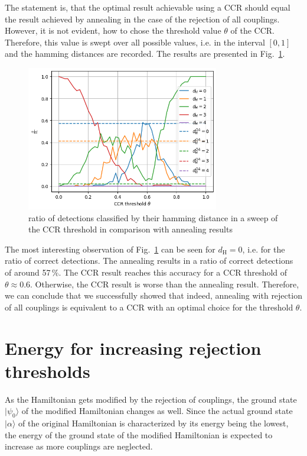 \documentclass{article}
\begin{document}
	The statement is, that the optimal result achievable using a CCR should equal the result achieved by annealing in the case of the rejection of all couplings. However, it is not evident, how to chose the threshold value $\theta$ of the CCR. Therefore, this value is swept over all possible values, i.e. in the interval $[0,1]$ and the hamming distances are recorded. The results are presented in Fig.~\ref{fig:CCR sweep}.
	\begin{figure}[h]
		\centering
		\includegraphics[width=0.75\textwidth]{img/CCR_sweep.png}
		\caption{ratio of detections classified by their hamming distance in a sweep of the CCR threshold in comparison with annealing results}
		\label{fig:CCR sweep}
	\end{figure}
	The most interesting observation of Fig.~\ref{fig:CCR sweep} can be seen for $d_\text{H}=0$, i.e. for the ratio of correct detections. The annealing results in a ratio of correct detections of around 57\,\%. The CCR result reaches this accuracy for a CCR threshold of $\theta\approx 0.6$. Otherwise, the CCR result is worse than the annealing result. Therefore, we can conclude that we successfully showed that indeed, annealing with rejection of all couplings is equivalent to a CCR with an optimal choice for the threshold $\theta$.
	
	
	\section{Energy for increasing rejection thresholds}\label{sec:energy}
	As the Hamiltonian gets modified by the rejection of couplings, the ground state $|\psi_0\rangle$ of the modified Hamiltonian changes as well. Since the actual ground state $|\alpha\rangle$ of the original Hamiltonian is characterized by its energy being the lowest, the energy of the ground state of the modified Hamiltonian is expected to increase as more couplings are neglected.
	
\end{document}
